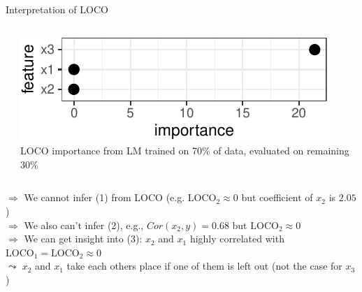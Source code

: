 \documentclass[11pt,compress,t,notes=noshow, aspectratio=169, xcolor=table]{beamer}
\begin{document}
\begin{frame}{Interpretation of LOCO}
\begin{columns}[c, totalwidth=\textwidth]
\begin{column}{0.42\textwidth}
\end{column}
\begin{column}{0.58\textwidth}
\centering
\includegraphics[width=0.9\linewidth]{figure_man/simulation_loco}\\
LOCO importance from LM trained on 70\% of data, evaluated on remaining 30\%


\end{column}
\end{columns}

\lz\pause

$\Rightarrow$ We cannot infer (1) from LOCO (e.g. $\text{LOCO}_2 \approx 0$ but coefficient of $x_2$ is $2.05$)\\\pause
$\Rightarrow$ We also can't infer (2), e.g., $Cor(x_2, y) = 0.68$ but $\text{LOCO}_2 \approx 0$\\\pause
$\Rightarrow$ We can get insight into (3): $x_2$ and $x_1$ highly correlated with $\text{LOCO}_1 = \text{LOCO}_2  \approx 0$ \\
\phantom{$\Rightarrow$} $\leadsto$ $x_2$ and $x_1$ take each others place if one of them is left out (not the case for $x_3$)
\end{frame}
\end{document}
